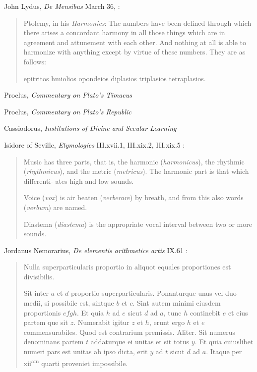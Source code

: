 \documentclass{amsart}
\newcommand{\textgreek}[1]{\begingroup\fontencoding{LGR}\selectfont#1\endgroup}
\theoremstyle{definition}
\begin{document}
John Lydus, {\em De Mensibus} March 36, \cite[p.~94]{lydus}:

\begin{quote}
Ptolemy, in his {\em Harmonics}: The numbers have been defined through which there arises a concordant harmony in all those things which are in agreement and attunement with each other. And nothing at all is able to harmonize with anything except by virtue of these numbers. They are as follows:

\textgreek{epitritos hmiolios opondeios diplasios triplasios tetraplasios}.
\end{quote}

Proclus, {\em Commentary on Plato's Timaeus} \cite{timaeum3II}

Proclus, {\em Commentary on Plato's Republic} \cite{festugiereII}

Cassiodorus, {\em Institutions of Divine and Secular Learning} \cite{cassiodorus}

Isidore of Seville, {\em Etymologies} III.xvii.1, III.xix.2, III.xix.5 \cite[p.~96]{isidore}:

\begin{quote}
Music has three parts, that is, the harmonic ({\em harmonicus}), the rhythmic ({\em rhythmicus}), and the metric ({\em metricus}). The harmonic part is that which differenti- ates high and low sounds.

Voice ({\em vox}) is air beaten ({\em verberare}) by breath, and from this also words ({\em verbum}) are named.

Diastema ({\em diastema}) is the appropriate vocal interval between two or more sounds. 
\end{quote}

Jordanus Nemorarius, {\em De elementis arithmetice artis} IX.61 \cite[pp.~193--194]{jordanus}:

\begin{quote}
Nulla superparticularis proportio in aliquot equales proportiones est
divisibilis.

Sit inter $a$ et $d$ proportio superparticularis. Ponanturque unus vel duo medii, si
possibile est, sintque $b$ et $c$. Sint autem minimi eiusdem proportionis $e f g h$. Et
quia $h$ ad $e$ sicut $d$ ad $a$, tunc $h$ continebit $e$ et eius partem que sit $z$. Numerabit
igitur $z$ et $h$, erunt ergo $h$ et $e$ commensurabiles. Quod est contrarium premissis.
Aliter. Sit numerus denominans partem $t$ addaturque ei unitas et sit totus $y$. Et
quia cuiuslibet numeri pars est unitas ab ipso dicta, erit $y$ ad $t$ sicut $d$ ad $a$. Itaque
per xii\textsuperscript{am} quarti proveniet impossibile.
\end{quote}
\end{document}
